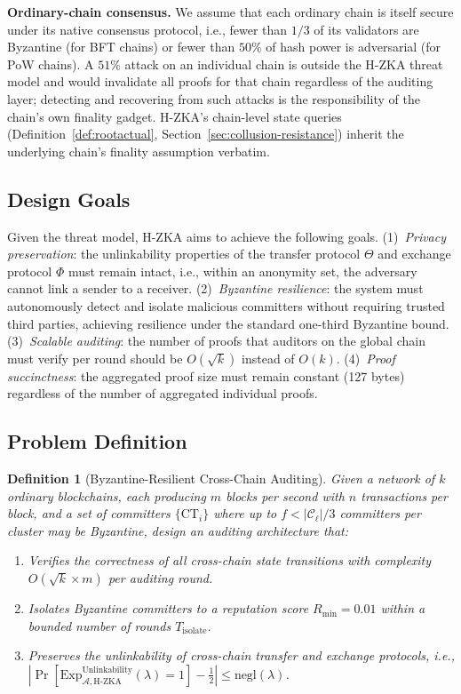 \documentclass[journal]{IEEEtran}
\newtheorem{definition}{Definition}
\begin{document}
\textbf{Ordinary-chain consensus.} We assume that each ordinary chain is itself secure under its native consensus protocol, i.e., fewer than $1/3$ of its validators are Byzantine (for BFT chains) or fewer than $50\%$ of hash power is adversarial (for PoW chains). A $51\%$ attack on an individual chain is outside the H-ZKA threat model and would invalidate all proofs for that chain regardless of the auditing layer; detecting and recovering from such attacks is the responsibility of the chain's own finality gadget. H-ZKA's chain-level state queries (Definition~\ref{def:rootactual}, Section~\ref{sec:collusion-resistance}) inherit the underlying chain's finality assumption verbatim.

\subsection{Design Goals}

Given the threat model, H-ZKA aims to achieve the following goals. (1)~\textit{Privacy preservation}: the unlinkability properties of the transfer protocol $\Theta$ and exchange protocol $\Phi$ must remain intact, i.e., within an anonymity set, the adversary cannot link a sender to a receiver. (2)~\textit{Byzantine resilience}: the system must autonomously detect and isolate malicious committers without requiring trusted third parties, achieving resilience under the standard one-third Byzantine bound. (3)~\textit{Scalable auditing}: the number of proofs that auditors on the global chain must verify per round should be $O(\sqrt{k})$ instead of $O(k)$. (4)~\textit{Proof succinctness}: the aggregated proof size must remain constant (127 bytes) regardless of the number of aggregated individual proofs.

\subsection{Problem Definition}

\begin{definition}[Byzantine-Resilient Cross-Chain Auditing]
Given a network of $k$ ordinary blockchains, each producing $m$ blocks per second with $n$ transactions per block, and a set of committers $\{\text{CT}_i\}$ where up to $f < |\mathcal{C}_\ell|/3$ committers per cluster may be Byzantine, design an auditing architecture that:
\begin{enumerate}
    \item Verifies the correctness of all cross-chain state transitions with complexity $O(\sqrt{k} \times m)$ per auditing round.
    \item Isolates Byzantine committers to a reputation score $R_{\min} = 0.01$ within a bounded number of rounds $T_{\text{isolate}}$.
    \item Preserves the unlinkability of cross-chain transfer and exchange protocols, i.e., $|\Pr[\text{Exp}^{\text{Unlinkability}}_{\mathcal{A}, \text{H-ZKA}}(\lambda) = 1] - \frac{1}{2}| \leq \text{negl}(\lambda)$.
\end{enumerate}
\end{definition}
\end{document}
